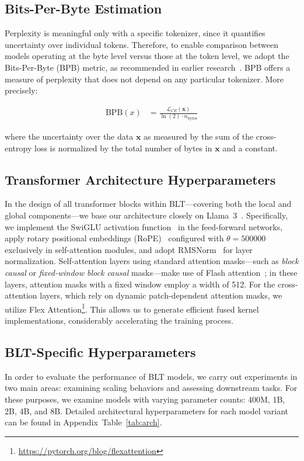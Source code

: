 \subsection{Bits-Per-Byte Estimation} Perplexity is meaningful only with a specific tokenizer, since it quantifies uncertainty over individual tokens. Therefore, to enable comparison between models operating at the byte level versus those at the token level, we adopt the Bits-Per-Byte (BPB) metric, as recommended in earlier research~\citep{xue2022byt5, yu2023megabyte, wang2024mambabyte}. BPB offers a measure of perplexity that does not depend on any particular tokenizer. More precisely:

\begin{align}
    \text{BPB}(x)&= \frac{\mathcal{L}_{CE}(\pmb{x})}{\ln(2)\cdot n_{\text{bytes}}}
\end{align}

where the uncertainty over the data $\pmb{x}$ as measured by the sum of the cross-entropy loss is normalized by the total number of bytes in $\pmb{x}$ and a constant. 

\subsection{Transformer Architecture Hyperparameters} In the design of all transformer blocks within {\textsc BLT}—covering both the local and global components—we base our architecture closely on Llama~3~\citep{dubey2024llama}. Specifically, we implement the SwiGLU activation function~\citep{swiglu} in the feed-forward networks, apply rotary positional embeddings (RoPE)~\citep{RoPe} configured with $\theta=500000$~\citep{xiong2024effective} exclusively in self-attention modules, and adopt RMSNorm~\citep{RMSNorm} for layer normalization. Self-attention layers using standard attention masks—such as \textit{block causal} or \textit{fixed-window block causal} masks—make use of Flash attention~\citep{dao2022flashattention}; in these layers, attention masks with a fixed window employ a width of 512. For the cross-attention layers, which rely on dynamic patch-dependent attention masks, we utilize Flex Attention\footnote{\url{https://pytorch.org/blog/flexattention}}. This allows us to generate efficient fused kernel implementations, considerably accelerating the training process.

\subsection{{\textsc BLT}-Specific Hyperparameters} In order to evaluate the performance of {\textsc BLT} models, we carry out experiments in two main areas: examining scaling behaviors and assessing downstream tasks. For these purposes, we examine models with varying parameter counts: 400M, 1B, 2B, 4B, and 8B. Detailed architectural hyperparameters for each model variant can be found in Appendix~Table~\ref{tab:arch}.

